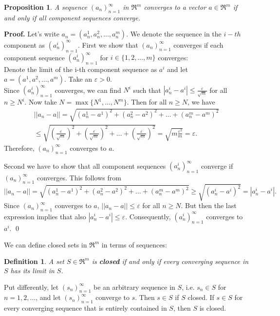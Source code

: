 \documentclass[a4paper,12pt]{article}
\newtheorem{proposition}{Proposition}
\newtheorem{definition}{Definition}
\theoremstyle{plain}
\begin{document}
\begin{proposition}
  A sequence $(a_n)_{n=1}^\infty$ in $\Re^m$ converges to a vector
  $a\in\Re^m$ if and only if all component sequences converge.
\end{proposition}
\textbf{Proof. }Let's write $a_n=(a_n^1,a_n^2,\dots,a_n^m)$. We denote the sequence in the $i-th$ component as $(a_n^i)_{n=1}^\infty$. First we show that $(a_n)_{n=1}^\infty$ converges if each component sequence $(a_n^i)_{n=1}^\infty$ for $i\in\{1,2,\dots,m\}$ converges:\\
Denote the limit of the i-th component sequence as $a^i$ and let $a=(a^1,a^2,\dots,a^m)$. Take an $\varepsilon>0 $. \\
Since $(a_n^i)_{n=1}^\infty$ converges, we can find $N^i$ such that $|a_n^i-a^i|\leq\frac{\varepsilon }{\sqrt{m}} $ for all $n\geq N^i$. Now take $N=\max\{N^1,\dots,N^m\}$. Then for all $n\geq N$, we have
\begin{multline*}
  ||a_n-a||=\sqrt{(a^1_n-a^1)^2+(a^2_n-a^2)^2+\dots+(a^m_n-a^m)^2}\\
\leq
  \sqrt{\left(\frac{\varepsilon
  }{\sqrt{m}}\right)^2+\left(\frac{\varepsilon
  }{\sqrt{m}}\right)^2+\dots+\left(\frac{\varepsilon
  }{\sqrt{m}}\right)^2}
  =\sqrt{m\frac{\varepsilon^2 }{m}}=\varepsilon.
  \end{multline*}
Therefore, $(a_n)_{n=1}^\infty$ converges to $a$.\par
Second we have to show that all component sequences $(a_n^i)_{n=1}^\infty$ converge if $(a_n)_{n=1}^\infty$ converges. This follows from
$$||a_n-a||=\sqrt{(a^1_n-a^1)^2+(a^2_n-a^2)^2+\dots+(a^m_n-a^m)^2}\geq \sqrt{(a_n^i-a^i)^2}=|a_n^i-a^i|.$$
Since $(a_n)_{n=1}^\infty$ converges to $a$, $||a_n-a||\leq \varepsilon $ for all $n\geq N$. But then the last expression implies that also $|a_n^i-a^i|\leq\varepsilon $. Consequently, $(a_n^i)_{n=1}^\infty$ converges to $a^i$.
\qed

We can define closed sets in $\Re^m$ in terms of sequences:
\begin{definition}
  A set $S\in \Re^m$ is \textbf{closed} if and only if every converging
  sequence in $S$ has its limit in $S$.
\end{definition}
Put differently, let $(s_n)_{n=1}^\infty$ be an arbitrary sequence in $S$, i.e. $s_n\in S$ for $n=1,2,\dots$, and let $(s_n)_{n=1}^\infty$ converge to $s$. Then $s\in S$ if $S$ closed. If $s\in S$ for every converging sequence that is entirely contained in $S$, then $S$ is closed.
\end{document}
